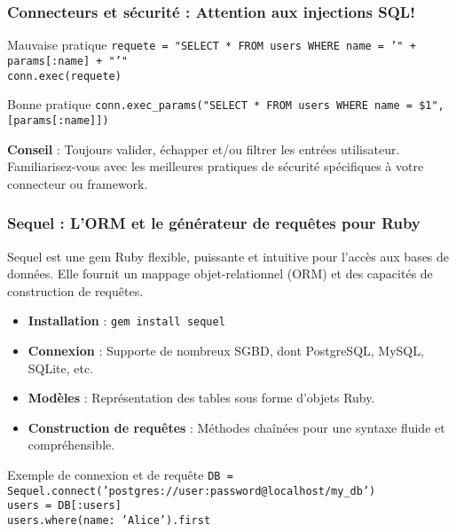 \begin{frame}
  \frametitle{Connecteurs et sécurité : Attention aux injections SQL!}
\begin{alertblock}{Mauvaise pratique}
  \small
  \texttt{requete = "SELECT * FROM users WHERE name = '" + params[:name] + "'" \\
  conn.exec(requete)}
\end{alertblock}

\begin{exampleblock}{Bonne pratique}
  \small
  \texttt{conn.exec\_params("SELECT * FROM users WHERE name = \$1", [params[:name]])}
\end{exampleblock}

\textbf{Conseil} : Toujours valider, échapper et/ou filtrer les entrées utilisateur. Familiarisez-vous avec les meilleures pratiques de sécurité spécifiques à votre connecteur ou framework.
\end{frame}

\begin{frame}
  \frametitle{Sequel : L'ORM et le générateur de requêtes pour Ruby}

  Sequel est une gem Ruby flexible, puissante et intuitive pour l'accès aux bases de données. Elle fournit un mappage objet-relationnel (ORM) et des capacités de construction de requêtes.

  \begin{itemize}
    \item \textbf{Installation} : \texttt{gem install sequel}
    \item \textbf{Connexion} : Supporte de nombreux SGBD, dont PostgreSQL, MySQL, SQLite, etc.
    \item \textbf{Modèles} : Représentation des tables sous forme d'objets Ruby.
    \item \textbf{Construction de requêtes} : Méthodes chaînées pour une syntaxe fluide et compréhensible.
  \end{itemize}

  \begin{exampleblock}{Exemple de connexion et de requête}
    \small
    \texttt{DB = Sequel.connect('postgres://user:password@localhost/my\_db') \\
    users = DB[:users] \\
    users.where(name: 'Alice').first}
  \end{exampleblock}

\end{frame}

